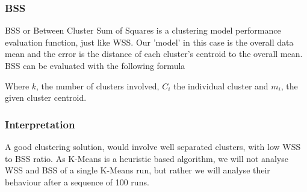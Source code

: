 \documentclass[11pt]{article}
\begin{document}
				\subsubsection*{BSS}
				BSS or  Between Cluster Sum of Squares is a clustering model performance evaluation function, just like WSS. Our 'model' in this case is the overall data mean and the error is the distance of each cluster's centroid to the overall mean. BSS can be evaluated with the following formula\cite{???}

				Where $k$, the number of clusters involved, $C_i$ the individual cluster and $m_i$, the given cluster centroid.
			\subsubsection*{Interpretation}
				A good clustering solution, would involve well separated clusters, with low WSS to BSS ratio\cite{???}. As K-Means is a heuristic based algorithm, we will not analyse WSS and BSS of a single K-Means run, but rather we will analyse their behaviour after a sequence of 100 runs. 
				\iffalse
\end{document}
